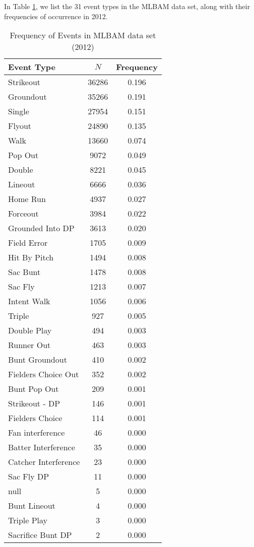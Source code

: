 \documentclass[letterpaper,titlepage]{article}
\begin{document}
In Table \ref{tab:events}, we list the 31 event types in the MLBAM data set, along with their frequencies of occurrence in 2012. 

\begin{table}[]
\centering
\begin{tabular}{lcc}
  \hline
Event Type & $N$ & Frequency \\ 
  \hline
Strikeout & 36286 & 0.196 \\ 
  Groundout & 35266 & 0.191 \\ 
  Single & 27954 & 0.151 \\ 
  Flyout & 24890 & 0.135 \\ 
  Walk & 13660 & 0.074 \\ 
  Pop Out & 9072 & 0.049 \\ 
  Double & 8221 & 0.045 \\ 
  Lineout & 6666 & 0.036 \\ 
  Home Run & 4937 & 0.027 \\ 
  Forceout & 3984 & 0.022 \\ 
  Grounded Into DP & 3613 & 0.020 \\ 
  Field Error & 1705 & 0.009 \\ 
  Hit By Pitch & 1494 & 0.008 \\ 
  Sac Bunt & 1478 & 0.008 \\ 
  Sac Fly & 1213 & 0.007 \\ 
  Intent Walk & 1056 & 0.006 \\ 
  Triple &  927 & 0.005 \\ 
  Double Play &  494 & 0.003 \\ 
  Runner Out &  463 & 0.003 \\ 
  Bunt Groundout &  410 & 0.002 \\ 
  Fielders Choice Out &  352 & 0.002 \\ 
  Bunt Pop Out &  209 & 0.001 \\ 
  Strikeout - DP &  146 & 0.001 \\ 
  Fielders Choice &  114 & 0.001 \\ 
  Fan interference &   46 & 0.000 \\ 
  Batter Interference &   35 & 0.000 \\ 
  Catcher Interference &   23 & 0.000 \\ 
  Sac Fly DP &   11 & 0.000 \\ 
  null &    5 & 0.000 \\ 
  Bunt Lineout &    4 & 0.000 \\ 
  Triple Play &    3 & 0.000 \\ 
  Sacrifice Bunt DP &    2 & 0.000 \\ 
   \hline
\end{tabular}
\caption{Frequency of Events in MLBAM data set (2012)} 
\label{tab:events}
\end{table}
\end{document}
